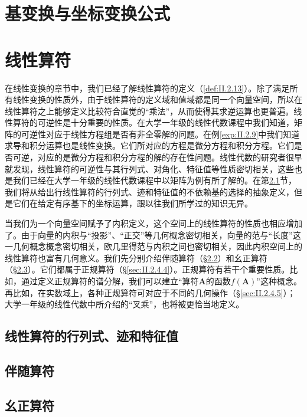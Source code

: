 \documentclass[zihao=-4,linespread=1.5,a4paper,heading=true,twoside]{ctexbook}
\theoremstyle{definition}
\theoremstyle{plain}
\begin{document}
\section{基变换与坐标变换公式}\label{sec:II.2.3}


\section{线性算符}\label{sec:II.2.4}
在线性变换的章节中，我们已经了解线性算符的定义（\ref{def:II.2.13}）。除了满足所有线性变换的性质外，由于线性算符的定义域和值域都是同一个向量空间，所以在线性算符之上能够定义比较符合直觉的“乘法”，从而使得其求逆运算也更普遍。线性算符的可逆性是十分重要的性质。在大学一年级的线性代数课程中我们知道，矩阵的可逆性对应于线性方程组是否有非全零解的问题。在例\ref{exp:II.2.9}中我们知道求导和积分运算也是线性变换。它们所对应的方程是微分方程和积分方程。它们是否可逆，对应的是微分方程和积分方程的解的存在性问题。线性代数的研究者很早就发现，线性算符的可逆性与其行列式、对角化、特征值等性质密切相关，这些也是我们已经在大学一年级的线性代数课程中以矩阵为例有所了解的。在第\ref{sec:II.2.4.1}节，我们将从给出行线性算符的行列式、迹和特征值的不依赖基的选择的抽象定义，但是它们在给定有序基下的坐标运算，跟以往我们所学过的知识无异。

当我们为一个向量空间赋予了内积定义，这个空间上的线性算符的性质也相应增加了。由于向量的内积与“投影”、“正交”等几何概念密切相关，向量的范与“长度”这一几何概念概念密切相关，欧几里得范与内积之间也密切相关，因此内积空间上的线性算符也富有几何意义。我们先分别介绍伴随算符（\S \ref{sec:II.2.4.2}）和幺正算符（\S \ref{sec:II.2.4.3}）。它们都属于正规算符（\S \ref{sec:II.2.4.4}）。正规算符有若干个重要性质。比如，通过定义正规算符的谱分解，我们可以建立“算符$\mathbf{A}$的函数$f\left(\mathbf{A}\right)$”这种概念。再比如，在实数域上，各种正规算符可对应于不同的几何操作（\S \ref{sec:II.2.4.5}）；大学一年级的线性代数中所介绍的“叉乘”，也将被更恰当地定义。

\subsection{线性算符的行列式、迹和特征值}\label{sec:II.2.4.1}

\subsection{伴随算符}\label{sec:II.2.4.2}

\subsection{幺正算符}\label{sec:II.2.4.3}

\end{document}

